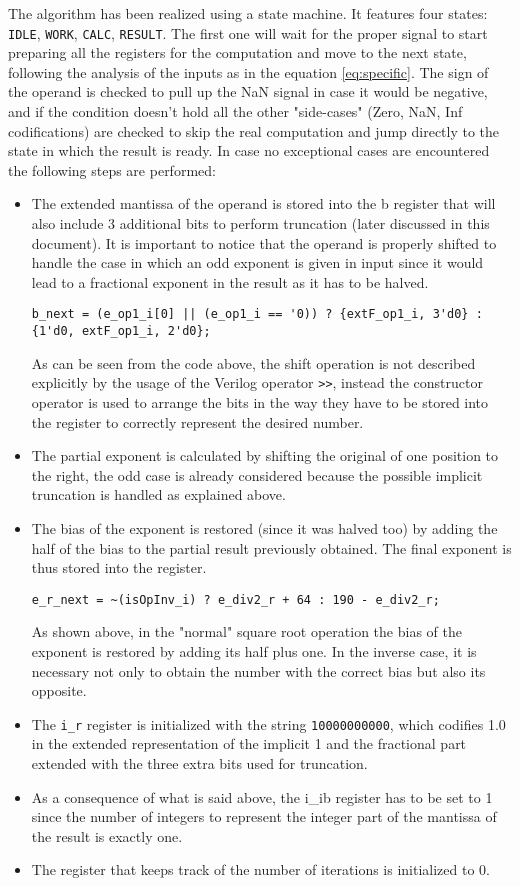 \documentclass[paper=letter, fontsize=12pt]{article}
\begin{document}
The algorithm has been realized using a state machine. It features four states: \texttt{IDLE}, \texttt{WORK}, \texttt{CALC}, \texttt{RESULT}. The first one will wait for the proper signal to start preparing all the registers for the computation and move to the next state, following the analysis of the inputs as in the equation \ref{eq:specific}. The sign of the operand is checked to pull up the NaN signal in case it would be negative, and if the condition doesn't hold all the other "side-cases" (Zero, NaN, Inf codifications) are checked to skip the real computation and jump directly to the state in which the result is ready. In case no exceptional cases are encountered the following steps are performed:
\begin{itemize}
    \item The extended mantissa of the operand is stored into the b register that will also include 3 additional bits to perform truncation (later discussed in this document). It is important to notice that the operand is properly shifted to handle the case in which an odd exponent is given in input since it would lead to a fractional exponent in the result as it has to be halved.
\begin{lstlisting}
b_next = (e_op1_i[0] || (e_op1_i == '0)) ? {extF_op1_i, 3'd0} : {1'd0, extF_op1_i, 2'd0};
\end{lstlisting}
    As can be seen from the code above, the shift operation is not described explicitly by the usage of the Verilog operator \texttt{>>}, instead the constructor operator is used to arrange the bits in the way they have to be stored into the register to correctly represent the desired number.
    \item The partial exponent is calculated by shifting the original of one position to the right, the odd case is already considered because the possible implicit truncation is handled as explained above.
    \item The bias of the exponent is restored (since it was halved too) by adding the half of the bias to the partial result previously obtained. The final exponent is thus stored into the register.
\begin{lstlisting}
e_r_next = ~(isOpInv_i) ? e_div2_r + 64 : 190 - e_div2_r;
\end{lstlisting}
    As shown above, in the "normal" square root operation the bias of the exponent is restored by adding its half plus one. In the inverse case, it is necessary not only to obtain the number with the correct bias but also its opposite.
    \item The \texttt{i\_r} register is initialized with the string \texttt{10000000000}, which codifies 1.0 in the extended representation of the implicit 1 and the fractional part extended with the three extra bits used for truncation.
    \item As a consequence of what is said above, the i\_ib register has to be set to 1 since the number of integers to represent the integer part of the mantissa of the result is exactly one.
    \item The register that keeps track of the number of iterations is initialized to 0.
\end{itemize}
\end{document}
